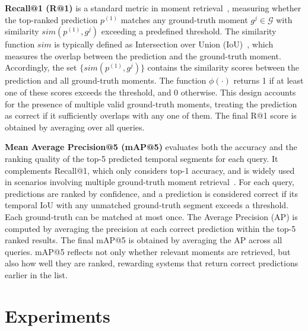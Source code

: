 \documentclass{article}
\begin{document}
\textbf{Recall@1 (R@1)} is a standard metric in moment retrieval~\cite{qvhighlights,hendricks2017didemo,gao2017charadeSTA}, measuring whether the top-ranked prediction $p^{(1)}$ matches any ground-truth moment $g^j \in \mathcal{G}$ with similarity $sim(p^{(1)}, g^j)$ exceeding a predefined threshold. The similarity function $sim$ is typically defined as Intersection over Union (IoU)~\cite{qvhighlights,hendricks2017didemo}, which measures the overlap between the prediction and the ground-truth moment. Accordingly, the set $\{sim(p^{(1)}, g^j)\}$ contains the similarity scores between the prediction and all ground-truth moments. The function $\phi(\cdot)$ returns 1 if at least one of these scores exceeds the threshold, and 0 otherwise. This design accounts for the presence of multiple valid ground-truth moments, treating the prediction as correct if it sufficiently overlaps with any one of them. The final R@1 score is obtained by averaging over all queries.


\textbf{Mean Average Precision@5 (mAP@5)} evaluates both the accuracy and the ranking quality of the top-5 predicted temporal segments for each query. It complements Recall@1, which only considers top-1 accuracy, and is widely used in scenarios involving multiple ground-truth moment retrieval~\cite{qvhighlights}. For each query, predictions are ranked by confidence, and a prediction is considered correct if its temporal IoU with any unmatched ground-truth segment exceeds a threshold. Each ground-truth can be matched at most once. The Average Precision (AP) is computed by averaging the precision at each correct prediction within the top-5 ranked results. The final mAP@5 is obtained by averaging the AP across all queries. mAP@5 reflects not only whether relevant moments are retrieved, but also how well they are ranked, rewarding systems that return correct predictions earlier in the list.



\section{Experiments}\label{sec:experiments} 
\end{document}
